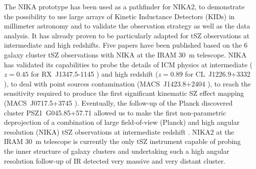 \documentclass[11pt,a4paper,twoside,graphicx,color]{article}
\begin{document}
The NIKA prototype has been used as a pathfinder for NIKA2, to demonstrate the possibility to use large arrays of Kinetic Inductance Detectors (KIDs) in millimeter astronomy and to validate the observation strategy as well as the data analysis. It has already proven to be particularly adapted for tSZ observations at intermediate and high redshifts. Five papers have been published based on the 6 galaxy cluster tSZ observations with NIKA at the IRAM 30~m telescope. NIKA has validated its capabilities to probe the details of ICM physics at intermediate ($z=0.45$ for RX~J1347.5-1145 \cite{ada14}) and high redshift ($z=0.89$ for CL~J1226.9+3332 \cite{ada15}), to deal with point sources contamination (MACS~J1423.8+2404 \cite{ada16a}), to reach the sensitivity required to produce the first significant kinematic SZ effect mapping (MACS~J0717.5+3745 \cite{ada16b}). Eventually, the follow-up of the Planck discovered cluster PSZ1~G045.85+57.71 allowed us to make the first non-parametric deprojection of a combination of large field-of-view (Planck) and high angular resolution (NIKA) tSZ observations at intermediate redshift \cite{rup16}. NIKA2 at the IRAM 30~m telescope is currently the only tSZ instrument capable of probing the inner structure of galaxy clusters and undertaking such a high angular resolution follow-up of IR detected very massive and very distant cluster.

\end{document}
